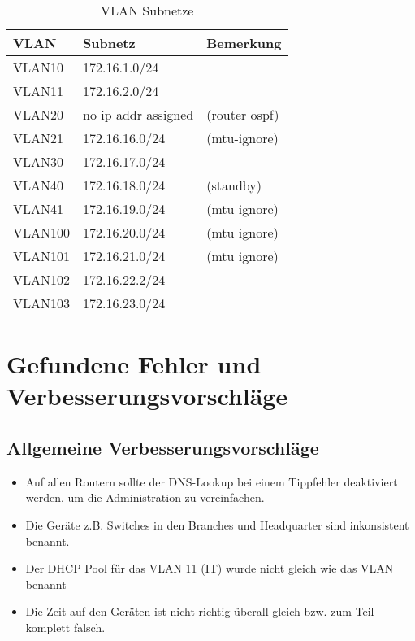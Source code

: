 \begin{table}[h]
	\centering
	\begin{tabu} to \linewidth {l l l}
		\toprule 
		VLAN & Subnetz & Bemerkung \\
		\midrule
		VLAN10 & 172.16.1.0/24 & \\
		VLAN11 & 172.16.2.0/24 & \\
		VLAN20 & no ip addr assigned & (router ospf) \\
		VLAN21 & 172.16.16.0/24 & (mtu-ignore) \\
		VLAN30 & 172.16.17.0/24 & \\
		VLAN40 & 172.16.18.0/24 & (standby) \\
		VLAN41 & 172.16.19.0/24 & (mtu ignore) \\
		VLAN100 & 172.16.20.0/24 & (mtu ignore) \\
		VLAN101 & 172.16.21.0/24 & (mtu ignore) \\
		VLAN102 & 172.16.22.2/24 & \\
		VLAN103 & 172.16.23.0/24 & \\
		\bottomrule 
	\end{tabu} 
	\caption{VLAN Subnetze}
\end{table}





\section{Gefundene Fehler und Verbesserungsvorschläge}


\subsection{Allgemeine Verbesserungsvorschläge}

\begin{itemize}
	\item Auf allen Routern sollte der DNS-Lookup bei einem Tippfehler deaktiviert werden, um die Administration zu vereinfachen.
	\item Die Geräte z.B. Switches in den Branches und Headquarter sind inkonsistent benannt.
	\item Der DHCP Pool für das VLAN 11 (IT) wurde nicht gleich wie das VLAN benannt
	\item Die Zeit auf den Geräten ist nicht richtig überall gleich bzw. zum Teil komplett falsch.
\end{itemize}

